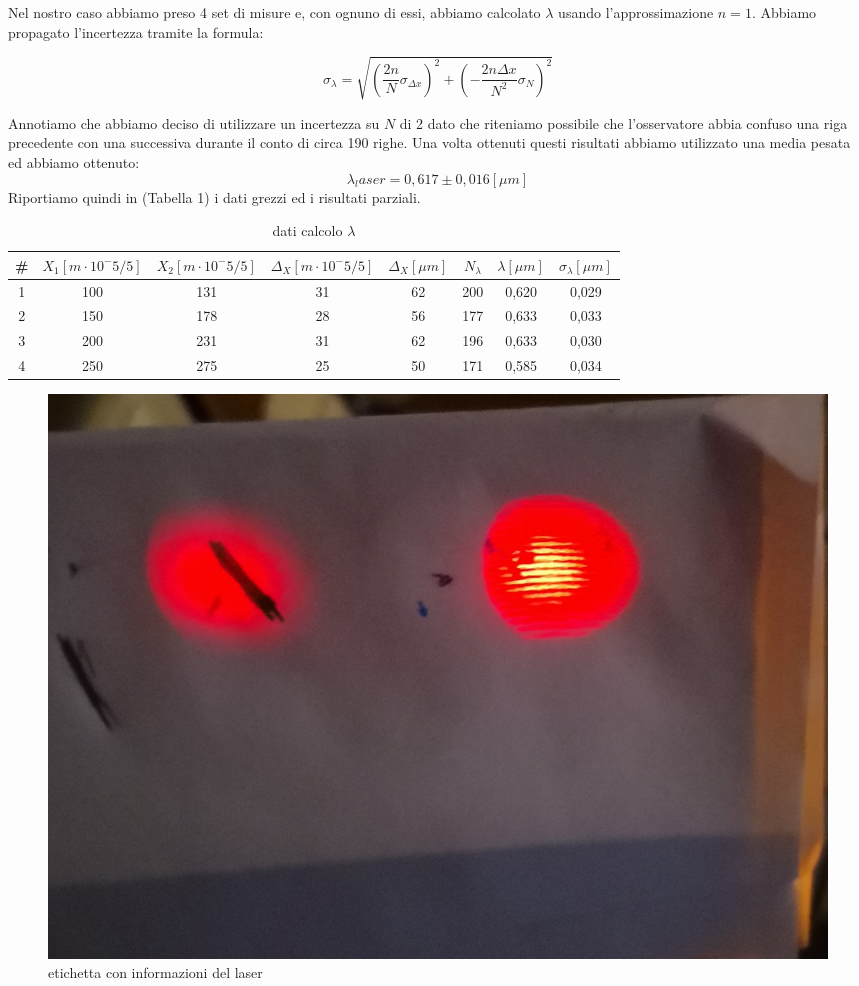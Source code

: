 \documentclass{article}
\begin{document}
Nel nostro caso abbiamo preso 4 set di misure e, con ognuno di essi, abbiamo calcolato $\lambda$ usando l'approssimazione $n = 1$. Abbiamo propagato l'incertezza tramite la formula:

\begin{equation} 
\sigma_\lambda= \sqrt{(\frac{2 n}{N} \sigma_{\Delta x})^2 + ({-} \frac{2 n \Delta x}{N^2} \sigma_N)^2}
\end{equation}

Annotiamo che abbiamo deciso di utilizzare un incertezza su $N$ di 2 dato che riteniamo possibile che l'osservatore abbia confuso una riga precedente con una successiva durante il conto di circa 190 righe.
Una volta ottenuti questi risultati abbiamo utilizzato una media pesata ed abbiamo ottenuto:
\[ \lambda_laser = 0,617 \pm 0,016 [\mu m] \]
Riportiamo quindi in (Tabella 1) i dati grezzi ed i risultati parziali.


\begin{table}[h!]
\centering
\begin{tabular}{ | c | c | c | c | c | c | c | c |}
\hline
 \# & $X_1 [m \cdot 10^-5/5]$ & $X_2 [m \cdot 10^-5/5]$ & $\Delta_X [m \cdot 10^-5/5]$ & $\Delta_X [\mu m]$ & $N_\lambda$ & $\lambda [\mu m]$ & $\sigma_\lambda [\mu m]$\\
\hline
   1 & 100 & 131 & 31 & 62 & 200 & 0,620 & 0,029\\
   2 & 150 & 178 & 28 & 56 & 177 & 0,633 & 0,033\\
   3 & 200 & 231 & 31 & 62 & 196 & 0,633 & 0,030\\
   4 & 250 & 275 & 25 & 50 & 171 & 0,585 & 0,034\\
\hline
\end{tabular}
\caption{dati calcolo $\lambda$}
\label{table:1}
\end{table}

\begin{figure}[h!]
  \centering
  \includegraphics[width=0.6\linewidth]{IM laser}
  \caption{etichetta con informazioni del laser}
\end{figure}
\end{document}

